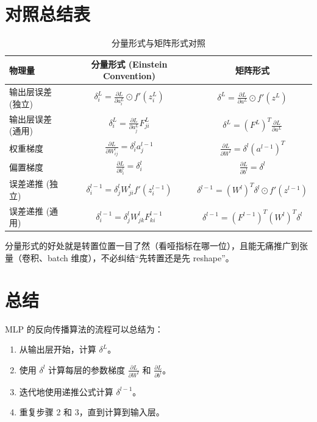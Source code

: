 \documentclass[11pt]{article}%
\begin{document}
    \section{对照总结表}

    \begin{table}[H]
        \centering
        \begin{tabular}{lcc}
            \toprule
            物理量 & 分量形式 (Einstein Convention) & 矩阵形式 \\
            \midrule
            输出层误差 (独立) & $\delta_i^L = \frac{\partial L}{\partial a_i^L} \odot f'(z_i^L)$ & $\delta^L = \frac{\partial L}{\partial a^L} \odot f'(z^L)$ \\
            输出层误差 (通用) & $\delta_i^L = \frac{\partial L}{\partial a_j^L} F_{ji}^L$ & $\delta^L = (F^L)^T \frac{\partial L}{\partial a^L}$ \\
            权重梯度 & $\frac{\partial L}{\partial W_{ij}^l} = \delta_i^l a_j^{l-1}$ & $\frac{\partial L}{\partial W^l} = \delta^l (a^{l-1})^T$ \\
            偏置梯度 & $\frac{\partial L}{\partial b_i^l} = \delta_i^l$ & $\frac{\partial L}{\partial b^l} = \delta^l$ \\
            误差递推 (独立) & $\delta_i^{l-1} = \delta_j^l W_{ji}^l f'(z_i^{l-1})$ & $\delta^{l-1} = (W^l)^T \delta^l \odot f'(z^{l-1})$ \\
            误差递推 (通用) & $\delta_i^{l-1} = \delta_j^l W_{jk}^l F_{ki}^{l-1}$ & $\delta^{l-1} = (F^{l-1})^T (W^l)^T \delta^l$ \\
            \bottomrule
        \end{tabular}
        \caption{分量形式与矩阵形式对照}
    \end{table}

    分量形式的好处就是转置位置一目了然（看哑指标在哪一位），且能无痛推广到张量（卷积、batch 维度），不必纠结“先转置还是先 reshape”。

    \section{总结}

    MLP 的反向传播算法的流程可以总结为：
    \begin{enumerate}
        \item 从输出层开始，计算 $\delta^L$。
        \item 使用 $\delta^l$ 计算每层的参数梯度 $\frac{\partial L}{\partial W^l}$ 和 $\frac{\partial L}{\partial b^l}$。
        \item 迭代地使用递推公式计算 $\delta^{l-1}$。
        \item 重复步骤 2 和 3，直到计算到输入层。
    \end{enumerate}
\end{document}
